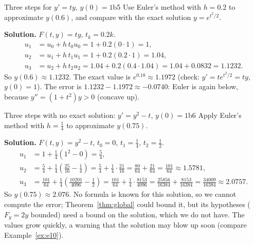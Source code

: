 \documentclass[11pt]{article}
\begin{document}
\begin{exmp}{Three steps for $y'=ty$, $y(0)=1$}{b5}
Use Euler's method with $h=0.2$ to approximate $y(0.6)$, and compare with the exact solution $y=e^{t^2/2}$.

\textbf{Solution.} $F(t,y)=ty$, $t_k=0.2k$.
\begin{align*}
u_1&=u_0+h\,t_0u_0=1+0.2(0\cdot1)=1,\\
u_2&=u_1+h\,t_1u_1=1+0.2(0.2\cdot1)=1.04,\\
u_3&=u_2+h\,t_2u_2=1.04+0.2(0.4\cdot1.04)=1.04+0.0832=1.1232.
\end{align*}
So $y(0.6)\approx1.1232$. The exact value is $e^{0.18}\approx1.1972$ (check: $y'=te^{t^2/2}=ty$, $y(0)=1$). The error is $1.1232-1.1972\approx-0.0740$: Euler is again below, because $y''=(1+t^2)y>0$ (concave up).
\end{exmp}

\begin{exmp}{Three steps with no exact solution: $y'=y^2-t$, $y(0)=1$}{b6}
Apply Euler's method with $h=\frac14$ to approximate $y(0.75)$.

\textbf{Solution.} $F(t,y)=y^2-t$, $t_0=0$, $t_1=\frac14$, $t_2=\frac12$. 
\begin{align*}
u_1&=1+\tfrac14(1^2-0)=\tfrac54,\\
u_2&=\tfrac54+\tfrac14\left(\tfrac{25}{16}-\tfrac14\right)=\tfrac54+\tfrac14\cdot\tfrac{21}{16}=\tfrac{80}{64}+\tfrac{21}{64}=\tfrac{101}{64}\approx1.5781,\\
u_3&=\tfrac{101}{64}+\tfrac14\left(\tfrac{10201}{4096}-\tfrac12\right)=\tfrac{101}{64}+\tfrac14\cdot\tfrac{8153}{4096}=\tfrac{25856}{16384}+\tfrac{8153}{16384}=\tfrac{34009}{16384}\approx2.0757.
\end{align*}
So $y(0.75)\approx2.076$. No formula is known for this solution, so we cannot compute the error; Theorem~\ref{thm:global} could bound it, but its hypotheses ($F_y=2y$ bounded) need a bound on the solution, which we do not have. The values grow quickly, a warning that the solution may blow up soon (compare Example~\ref{ex:e10}).
\end{exmp}
\end{document}
